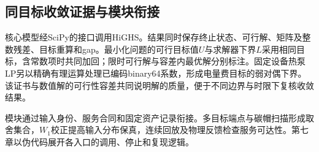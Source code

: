 \subsection{同目标收敛证据与模块衔接}

核心模型经SciPy的接口调用HiGHS。结果同时保存终止状态、可行解、矩阵及整数残差、目标重算和gap。最小化问题的可行目标值$U$与求解器下界$L$采用相同目标，含常数项时共同加回；限时可行解与容差内最优解分别标注。固定设备热泵LP另以精确有理运算处理已编码binary64系数，形成电量费目标的弱对偶下界。该证书与数值解的可行性容差共同说明解的质量，便于不同边界与时限下复核收敛结果。

模块通过输入身份、服务合同和固定资产记录衔接。多目标端点与碳帽扫描形成取舍集合，$W_1$校正提高输入分布保真，连续回放及物理反馈检查服务可达性。第七章以伪代码展开各入口的调用、停止和复现逻辑。
